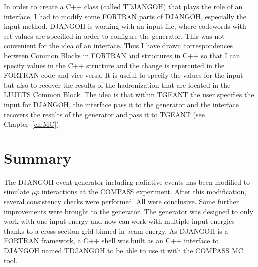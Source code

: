 In order to create a C++ class (called TDJANGOH) that plays the role of an interface, I had to modify some FORTRAN parts of DJANGOH, especially the input method. DJANGOH is working with an input file, where codewords with set values are specified in order to configure the generator. This was not convenient for the idea of an interface. Thus I have drawn correspondences between Common Blocks in FORTRAN and structures in C++ so that I can specify values in the C++ structure and the change is repercuted in the FORTRAN code and vice-versa. It is useful to specify the values for the input but also to recover the results of the hadronization that are located in the LUJETS Common Block. The idea is that within TGEANT the user specifies the input for DJANGOH, the interface pass it to the generator and the interface recovers the results of the generator and pass it to TGEANT (see Chapter~\ref{ch:MC}).


\section{Summary}

The DJANGOH event generator including radiative events has been modified to simulate $\mu p$ interactions at the COMPASS experiment. After this modification, several consistency checks were performed. All were conclusive. Some further improvements were brought to the generator. The generator was designed to only work with one input energy and now can work with multiple input energies thanks to a cross-section grid binned in beam energy. As DJANGOH is a FORTRAN framework, a C++ shell was built as an C++ interface to DJANGOH named TDJANGOH to be able to use it with the COMPASS MC tool.
